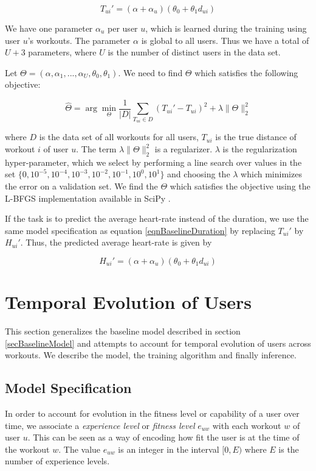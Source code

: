 \documentclass{acm_proc_article-sp}
\begin{document}
\begin{equation}
\label{eqnBaselineDuration}
T_{ui}' = (\alpha + \alpha_{u})(\theta_0 + \theta_1 d_{ui})
\end{equation}

We have one parameter $\alpha_u$ per user $u$, which is learned during the training using user $u$'s workouts. The parameter $\alpha$ is global to all users. Thus we have a total of $U + 3$ parameters, where $U$ is the number of distinct users in the data set. 

Let $\Theta = (\alpha, \alpha_1, ... , \alpha_U, \theta_0, \theta_1)$. We need to find $\Theta$ which satisfies the following objective:

$$\hat{\Theta} = \arg\min_{\Theta}\frac{1}{|D|} \sum_{T_{ui} \in D}(T_{ui}' - T_{ui})^2 + \lambda \|\Theta \|_2^2 $$

where $D$ is the data set of all workouts for all users, $T_{ui}$ is the true distance of workout $i$ of user $u$. The term $\lambda \|\Theta \|_2^2$ is a regularizer. $\lambda$ is the regularization hyper-parameter, which we select by performing a line search over values in the set $\{0, 10^{-5}, 10^{-4}, 10^{-3}, 10^{-2}, 10^{-1}, 10^0, 10^1\}$ and choosing the $\lambda$ which minimizes the error on a validation set. We find the $\Theta$ which satisfies the objective using the L-BFGS \cite{lbfgs} implementation available in SciPy \cite{scipy}.

If the task is to predict the average heart-rate instead of the duration, we use the same model specification as equation \ref{eqnBaselineDuration} by replacing $T_{ui}'$ by $H_{ui}'$. Thus, the predicted average heart-rate is given by

$$H_{ui}' = (\alpha + \alpha_{u})(\theta_0 + \theta_1 d_{ui})$$


\section{Temporal Evolution of Users}
\label{secTemporalModelUsers}
This section generalizes the baseline model described in section \ref{secBaselineModel} and attempts to account for temporal evolution of users across workouts. We describe the model, the training algorithm and finally inference.

\subsection{Model Specification}
In order to account for evolution in the fitness level or capability of a user over time,  we associate a \emph{experience level} or \emph{fitness level} $e_{uw}$ with each workout $w$ of user $u$. This can be seen as a way of encoding how fit the user is at the time of the workout $w$. The value $e_{uw}$ is an integer in the interval $[0, E)$ where $E$ is the number of experience levels. 
\end{document}
